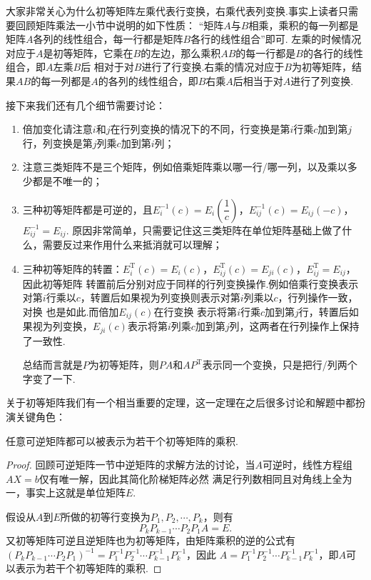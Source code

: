 大家非常关心为什么初等矩阵左乘代表行变换，右乘代表列变换.事实上读者只需要回顾矩阵乘法一小节中说明的如下性质：
``矩阵$A$与$B$相乘，乘积的每一列都是矩阵$A$各列的线性组合，每一行都是矩阵$B$各行的线性组合''即可.
左乘的时候情况对应于$A$是初等矩阵，它乘在$B$的左边，那么乘积$AB$的每一行都是$B$的各行的线性组合，即$A$左乘$B$后
相对于对$B$进行了行变换.右乘的情况对应于$B$为初等矩阵，结果$AB$的每一列都是$A$的各列的线性组合，即$B$右乘$A$后相当于对$A$进行了列变换.

接下来我们还有几个细节需要讨论：
\begin{enumerate}
    \item 倍加变化请注意$i$和$j$在行列变换的情况下的不同，行变换是第$i$行乘$c$加到第$j$行，列变换是第$j$列乘$c$加到第$i$列；

    \item 注意三类矩阵不是三个矩阵，例如倍乘矩阵乘以哪一行/哪一列，以及乘以多少都是不唯一的；

    \item 三种初等矩阵都是可逆的，且$E_i^{-1}(c)=E_i\left(\dfrac{1}{c}\right)$，$E_{ij}^{-1}(c)=E_{ij}(-c)$，$E_{ij}^{-1}=E_{ij}$.
    原因非常简单，只需要记住这三类矩阵在单位矩阵基础上做了什么，需要反过来作用什么来抵消就可以理解；

    \item 三种初等矩阵的转置：$E_i^\mathrm{T}(c)=E_i(c)$，$E_{ij}^\mathrm{T}(c)=E_{ji}(c)$，$E_{ij}^\mathrm{T}=E_{ij}$，因此初等矩阵
    转置前后分别对应于同样的行列变换操作.例如倍乘行变换表示对第$i$行乘以$c$，转置后如果视为列变换则表示对第$i$列乘以$c$，行列操作一致，对换
    也是如此.而倍加$E_{ij}(c)$在行变换
    表示将第$i$行乘$c$加到第$j$行，转置后如果视为列变换，$E_{ji}(c)$表示将第$i$列乘$c$加到第$j$列，这两者在行列操作上保持了一致性.

    总结而言就是$P$为初等矩阵，则$PA$和$AP^\mathrm{T}$表示同一个变换，只是把行/列两个字变了一下.
\end{enumerate}

关于初等矩阵我们有一个相当重要的定理，这一定理在之后很多讨论和解题中都扮演关键角色：
\begin{theorem}
    任意可逆矩阵都可以被表示为若干个初等矩阵的乘积.
\end{theorem}
\begin{proof}
    回顾可逆矩阵一节中逆矩阵的求解方法的讨论，当$A$可逆时，线性方程组$AX=b$仅有唯一解，因此其简化阶梯矩阵必然
    满足行列数相同且对角线上全为一，事实上这就是单位矩阵$E$.

    假设从$A$到$E$所做的初等行变换为$P_1,P_2,\cdots,P_k$，则有
    \[P_kP_{k-1}\cdots P_2P_1A=E.\]
    又初等矩阵可逆且逆矩阵也为初等矩阵，由矩阵乘积的逆的公式有$(P_kP_{k-1}\cdots P_2P_1)^{-1}=P_1^{-1}P_2^{-1}\cdots P_{k-1}^{-1}P_k^{-1}$，因此
    $A=P_1^{-1}P_2^{-1}\cdots P_{k-1}^{-1}P_k^{-1}$，即$A$可以表示为若干个初等矩阵的乘积.
\end{proof}

